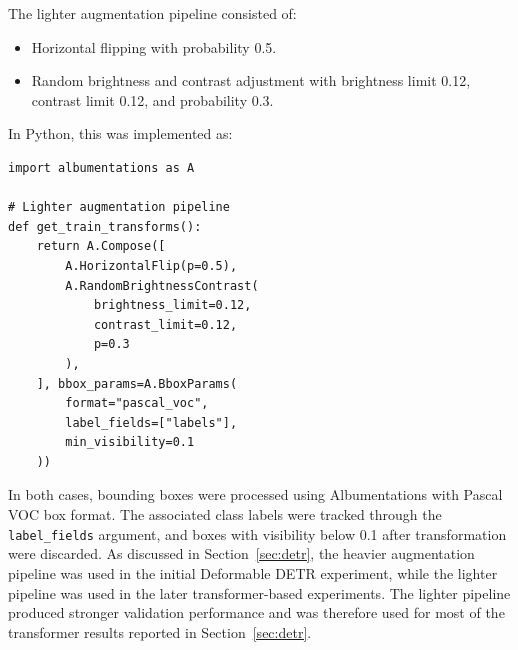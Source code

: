 The lighter augmentation pipeline consisted of:
\begin{itemize}
    \item Horizontal flipping with probability 0.5.
    \item Random brightness and contrast adjustment with brightness limit 0.12, contrast limit 0.12, and probability 0.3.
\end{itemize}

In Python, this was implemented as:

\begin{verbatim}
import albumentations as A

# Lighter augmentation pipeline
def get_train_transforms():
    return A.Compose([
        A.HorizontalFlip(p=0.5),
        A.RandomBrightnessContrast(
            brightness_limit=0.12,
            contrast_limit=0.12,
            p=0.3
        ),
    ], bbox_params=A.BboxParams(
        format="pascal_voc",
        label_fields=["labels"],
        min_visibility=0.1
    ))
\end{verbatim}

In both cases, bounding boxes were processed using Albumentations with Pascal VOC 
box format. The associated class labels were tracked through the \texttt{label\_fields} 
argument, and boxes with visibility below 0.1 after transformation were discarded.
As discussed in Section~\ref{sec:detr}, the heavier augmentation pipeline was used in the
initial Deformable DETR experiment, while the lighter pipeline was used in the later
transformer-based experiments. The lighter pipeline produced stronger validation
performance and was therefore used for most of the transformer results reported in
Section~\ref{sec:detr}.
